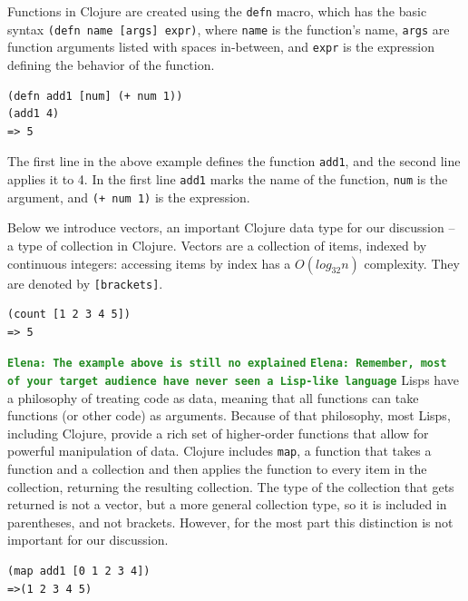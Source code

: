 \documentclass[12pt]{article}
\newcommand{\comment}[1]{{\bf \tt  {#1}}}
\newcommand{\emcomment}[1]{\textcolor{ForestGreen}{\comment{Elena: {#1}}}}
\newcommand{\clocode}[1]{{\texttt {#1}}}
\begin{document}
Functions in Clojure are created using the \clocode{defn} macro, which has the basic syntax \clocode{(defn name [args] expr)}, where \clocode{name} is the function's name, \clocode{args} are function arguments listed with spaces in-between, and \clocode{expr} is the expression defining the behavior of the function. 
\begin{verbatim}
(defn add1 [num] (+ num 1))
(add1 4)
=> 5
\end{verbatim} 
The first line in the above example defines the function \clocode{add1}, and the second line applies it to 4. In the first line \clocode{add1} marks the name of the function, \clocode{num} is the argument, and \clocode{(+ num 1)} is the expression.

Below we introduce vectors, an important Clojure data type for our discussion -- a type of collection in Clojure. Vectors are a collection of items, indexed by continuous integers: accessing items by index has a $O(log_{32}n)$  complexity. They are denoted by 
\clocode{[brackets]}.
\begin{verbatim}
(count [1 2 3 4 5])
=> 5
\end{verbatim}
\emcomment{The example above is still no explained}
\emcomment{Remember, most of your target audience have never seen a Lisp-like language}
Lisps have a philosophy of treating code as data, meaning that all functions can take functions (or other code) as arguments. Because of that philosophy, most Lisps, including Clojure, provide a rich set of higher-order functions that allow for powerful manipulation of data. Clojure includes \clocode{map}, a function that takes a function and a collection and then applies the function to every item in the collection, returning the resulting collection. The type of the collection that gets returned is not a vector, but a more general collection type, so it is included in parentheses, and not brackets. However, for the most part this distinction is not important for our discussion. 
\begin{verbatim}
(map add1 [0 1 2 3 4])
=>(1 2 3 4 5)
\end{verbatim}
\end{document}
